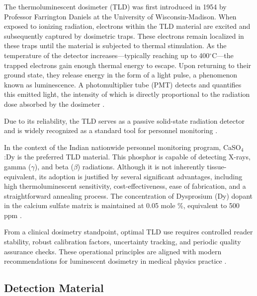 The thermoluminescent dosimeter (TLD) was first introduced in 1954 by Professor Farrington Daniels at the University of Wisconsin-Madison. When exposed to ionizing radiation, electrons within the TLD material are excited and subsequently captured by dosimetric traps. These electrons remain localized in these traps until the material is subjected to thermal stimulation. As the temperature of the detector increases—typically reaching up to 400$^\circ$C—the trapped electrons gain enough thermal energy to escape. Upon returning to their ground state, they release energy in the form of a light pulse, a phenomenon known as luminescence. A photomultiplier tube (PMT) detects and quantifies this emitted light, the intensity of which is directly proportional to the radiation dose absorbed by the dosimeter \cite{rivera_thermoluminescence_2012,gibbons_khans_2020}.

Due to its reliability, the TLD serves as a passive solid-state radiation detector and is widely recognized as a standard tool for personnel monitoring \cite{kry_aapm_2020}.

In the context of the Indian nationwide personnel monitoring program, CaSO$_4$:Dy is the preferred TLD material. This phosphor is capable of detecting X-rays, gamma ($\gamma$), and beta ($\beta$) radiations. Although it is not inherently tissue-equivalent, its adoption is justified by several significant advantages, including high thermoluminescent sensitivity, cost-effectiveness, ease of fabrication, and a straightforward annealing process. The concentration of Dysprosium (Dy) dopant in the calcium sulfate matrix is maintained at 0.05 mole \%, equivalent to 500 ppm \cite{del_sol_fernandez_thermoluminescent_2016,nuraeni_preliminary_2017}.

From a clinical dosimetry standpoint, optimal TLD use requires controlled reader stability, robust calibration factors, uncertainty tracking, and periodic quality assurance checks. These operational principles are aligned with modern recommendations for luminescent dosimetry in medical physics practice \cite{kry_aapm_2020}.

\subsection{Detection Material}

